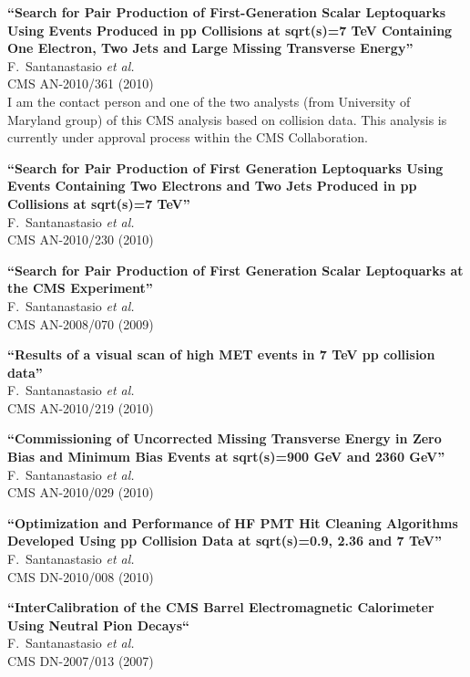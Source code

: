 \documentclass[10pt, a4paper]{article}
\begin{document}
\begin{thebibliography}{599}
{\bf ``Search for Pair Production of First-Generation Scalar Leptoquarks Using Events Produced in pp Collisions at sqrt(s)=7 TeV Containing One Electron, Two Jets and Large Missing Transverse Energy''}
  \\{}F.~Santanastasio {\it et al.}
  \\{}CMS AN-2010/361 (2010)
  \\I am the contact person and one of the two analysts (from University of Maryland group) of this CMS analysis based on collision data. This analysis is currently under approval process within the CMS Collaboration.

{\bf ``Search for Pair Production of First Generation Leptoquarks Using Events Containing Two Electrons and Two Jets Produced in pp Collisions at sqrt(s)=7 TeV''}
  \\{}F.~Santanastasio {\it et al.}
  \\{}CMS AN-2010/230 (2010)

{\bf ``Search for Pair Production of First Generation Scalar Leptoquarks at the CMS Experiment''}
  \\{}F.~Santanastasio {\it et al.}
  \\{}CMS AN-2008/070 (2009)

{\bf ``Results of a visual scan of high MET events in 7 TeV pp collision data''}
  \\{}F.~Santanastasio {\it et al.}
  \\{}CMS AN-2010/219 (2010)
  
{\bf ``Commissioning of Uncorrected Missing Transverse Energy in Zero Bias and Minimum Bias Events at  sqrt(s)=900 GeV and  2360 GeV''}
  \\{}F.~Santanastasio {\it et al.}
  \\{}CMS AN-2010/029 (2010)

{\bf ``Optimization and Performance of HF PMT Hit Cleaning Algorithms Developed Using pp Collision Data at sqrt(s)=0.9, 2.36 and 7 TeV''}
  \\{}F.~Santanastasio {\it et al.}
  \\{}CMS DN-2010/008 (2010)

{\bf ``InterCalibration of the CMS Barrel Electromagnetic Calorimeter Using Neutral Pion Decays``}
   \\{}F.~Santanastasio {\it et al.}
  \\{}CMS DN-2007/013 (2007)


\end{thebibliography}
\end{document}
